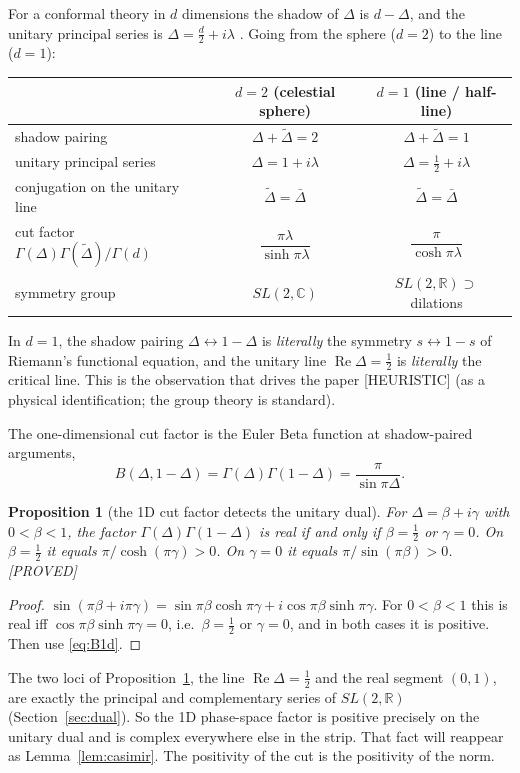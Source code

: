 \documentclass[11pt,a4paper]{article}
\theoremstyle{plain}
\newtheorem{proposition}[theorem]{Proposition}
\theoremstyle{definition}
\theoremstyle{remark}
\newcommand{\R}{\mathbb{R}}
\newcommand{\C}{\mathbb{C}}
\newcommand{\lab}[1]{\textsf{\small[#1]}}
\newcommand{\PROVED}{\lab{PROVED}}
\newcommand{\HEUR}{\lab{HEURISTIC}}
\renewcommand{\Re}{\operatorname{Re}}
\begin{document}
For a conformal theory in $d$ dimensions the shadow of $\Delta$ is
$d-\Delta$, and the unitary principal series is $\Delta=\tfrac d2+i\lambda$
\cite{Dobrev1977}. Going from the sphere ($d=2$) to the line ($d=1$):
\begin{center}
\begin{tabular}{lcc}
\toprule
 & $d=2$ (celestial sphere) & $d=1$ (line / half-line)\\
\midrule
shadow pairing & $\Delta+\tilde\Delta=2$ & $\Delta+\tilde\Delta=1$\\
unitary principal series & $\Delta=1+i\lambda$ & $\Delta=\tfrac12+i\lambda$\\
conjugation on the unitary line & $\tilde\Delta=\bar\Delta$ & $\tilde\Delta=\bar\Delta$\\
cut factor $\Gamma(\Delta)\Gamma(\tilde\Delta)/\Gamma(d)$ &
$\dfrac{\pi\lambda}{\sinh\pi\lambda}$ & $\dfrac{\pi}{\cosh\pi\lambda}$\\
symmetry group & $SL(2,\C)$ & $SL(2,\R)\supset$ dilations\\
\bottomrule
\end{tabular}
\end{center}
In $d=1$, the shadow pairing $\Delta\leftrightarrow1-\Delta$ is
\emph{literally} the symmetry $s\leftrightarrow1-s$ of Riemann's functional
equation, and the unitary line $\Re\Delta=\tfrac12$ is \emph{literally} the
critical line. This is the observation that drives the paper \HEUR{} (as a
physical identification; the group theory is standard).

The one-dimensional cut factor is the Euler Beta function at shadow-paired
arguments,
\begin{equation}\label{eq:B1d}
B(\Delta,1-\Delta)=\Gamma(\Delta)\Gamma(1-\Delta)=\frac{\pi}{\sin\pi\Delta}.
\end{equation}
\begin{proposition}[the 1D cut factor detects the unitary dual]\label{prop:cut1d}
For $\Delta=\beta+i\gamma$ with $0<\beta<1$, the factor
$\Gamma(\Delta)\Gamma(1-\Delta)$ is real if and only if $\beta=\tfrac12$ or
$\gamma=0$. On $\beta=\tfrac12$ it equals $\pi/\cosh(\pi\gamma)>0$. On
$\gamma=0$ it equals $\pi/\sin(\pi\beta)>0$. \PROVED
\end{proposition}
\begin{proof}
$\sin(\pi\beta+i\pi\gamma)=\sin\pi\beta\cosh\pi\gamma+i\cos\pi\beta\sinh\pi\gamma$.
For $0<\beta<1$ this is real iff $\cos\pi\beta\sinh\pi\gamma=0$, i.e.\
$\beta=\tfrac12$ or $\gamma=0$, and in both cases it is positive. Then use
\eqref{eq:B1d}.
\end{proof}
\noindent
The two loci of Proposition~\ref{prop:cut1d}, the line $\Re\Delta=\tfrac12$
and the real segment $(0,1)$, are exactly the principal and complementary
series of $SL(2,\R)$ (Section~\ref{sec:dual}). So the 1D phase-space factor
is positive precisely on the unitary dual and is complex everywhere else in
the strip. That fact will reappear as Lemma~\ref{lem:casimir}. The positivity
of the cut is the positivity of the norm.
\end{document}
